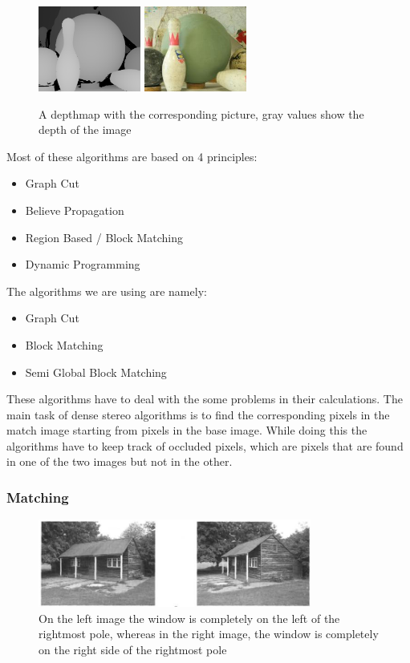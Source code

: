 \documentclass[a4paper]{article}
\begin{document}
\begin{figure} \centering
\includegraphics[width=0.3\textwidth]{depthmap}
\includegraphics[width=0.3\textwidth]{depthmap_original}
\caption{A depthmap with the corresponding picture, gray values show
  the depth of the image}
\label{dm_example}
\end{figure}

Most of these algorithms are based on 4 principles:
\begin{itemize}
\item Graph Cut
\item Believe Propagation
\item Region Based / Block Matching
\item Dynamic Programming
\end{itemize}

The algorithms we are using are namely:
\begin{itemize}
\item Graph Cut
\item Block Matching
\item Semi Global Block Matching
\end{itemize}

These algorithms have to deal with the some problems in their
calculations. The main task of dense stereo algorithms is to find the
corresponding pixels in the match image starting from pixels in the
base image. While doing this the algorithms have to keep track of
occluded pixels, which are pixels that are found in one of the two images but
not in the other. 

\subsubsection{Matching}
\begin{figure} [h!tb]
\centering
\includegraphics[width=0.8\textwidth]{matching_problems_direction}
\caption{On the left image the window is completely on the left of the
  rightmost pole, whereas in the right image, the window is completely
  on the right side of the rightmost pole}
\label{dirprob}
\end{figure}
\end{document}
